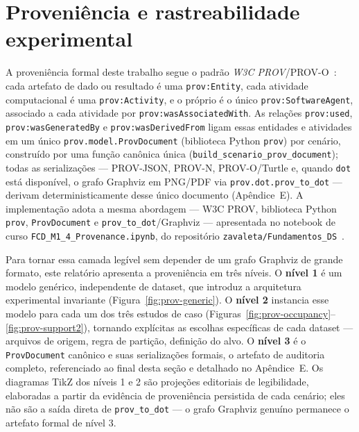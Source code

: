 \section{Proveniência e rastreabilidade experimental}
\label{sec:provenance}

\begin{sloppypar}
A proveniência formal deste trabalho segue o padrão \emph{W3C PROV}/PROV-O~\cite{provo2013}: cada artefato de dado ou resultado é uma \texttt{prov:Entity}, cada atividade computacional é uma \texttt{prov:Activity}, e o próprio \CoInfoSim{} é o único \texttt{prov:SoftwareAgent}, associado a cada atividade por \texttt{prov:wasAssociatedWith}. As relações \texttt{prov:used}, \texttt{prov:wasGeneratedBy} e \texttt{prov:wasDerivedFrom} ligam essas entidades e atividades em um único \texttt{prov.model.ProvDocument} (biblioteca Python \texttt{prov}) por cenário, construído por uma função canônica única (\texttt{build\_\allowbreak{}scenario\_\allowbreak{}prov\_\allowbreak{}document}); todas as serializações --- PROV-JSON, PROV-N, PROV-O/Turtle e, quando \texttt{dot} está disponível, o grafo Graphviz em PNG/PDF via \texttt{prov.dot.prov\_to\_dot} --- derivam deterministicamente desse único documento (Apêndice~E). A implementação adota a mesma abordagem --- W3C PROV, biblioteca Python \texttt{prov}, \texttt{ProvDocument} e \texttt{prov\_to\_dot}/Graphviz --- apresentada no notebook de curso \texttt{FCD\_\allowbreak{}M1\_\allowbreak{}4\_\allowbreak{}Provenance.ipynb}, do repositório \texttt{zavaleta/\allowbreak{}Fundamentos\_DS}~\cite{zavaleta_fcd_provenance}.
\end{sloppypar}

Para tornar essa camada legível sem depender de um grafo Graphviz de grande formato, este relatório apresenta a proveniência em três níveis. O \textbf{nível 1} é um modelo genérico, independente de dataset, que introduz a arquitetura experimental invariante (Figura~\ref{fig:prov-generic}). O \textbf{nível 2} instancia esse modelo para cada um dos três estudos de caso (Figuras~\ref{fig:prov-occupancy}--\ref{fig:prov-support2}), tornando explícitas as escolhas específicas de cada dataset --- arquivos de origem, regra de partição, definição do alvo. O \textbf{nível 3} é o \texttt{ProvDocument} canônico e suas serializações formais, o artefato de auditoria completo, referenciado ao final desta seção e detalhado no Apêndice~E. Os diagramas TikZ dos níveis 1 e 2 são projeções editoriais de legibilidade, elaboradas a partir da evidência de proveniência persistida de cada cenário; eles não são a saída direta de \texttt{prov\_to\_dot} --- o grafo Graphviz genuíno permanece o artefato formal de nível 3.

